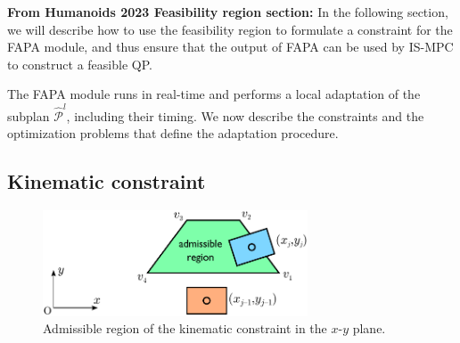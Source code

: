 \textbf{From Humanoids 2023 Feasibility region section:} In the following
section, we will describe how to use the feasibility region to formulate a
constraint for the FAPA module, and thus ensure that the output of FAPA can be
used by IS-MPC to construct a feasible QP.

The FAPA module runs in real-time and performs a local adaptation of the
subplan $\mathcal{\hat P}^l$, including their timing. We now describe the
constraints and the optimization problems that define the adaptation procedure.

\subsection{Kinematic constraint}

\begin{figure}
    \centering
    \includegraphics[width=0.7\textwidth]{figures/humanoids_kinconstr.pdf}
    \caption{Admissible region of the kinematic constraint in the $x$-$y$ plane.}
    \label{fig:FAPA:kinematic-constraint}
\end{figure}

